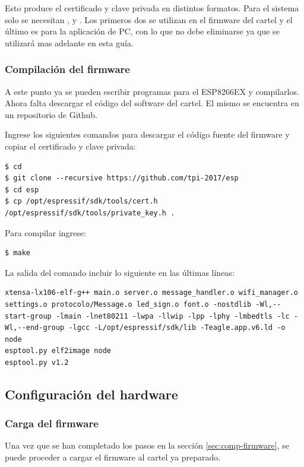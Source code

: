 Esto produce el certificado y clave privada en distintos formatos. Para el sistema solo se necesitan ,  y . Los primeros dos se utilizan en el firmware del cartel y el último es para la aplicación de PC, con lo que no debe eliminarse ya que se utilizará mas adelante en esta guía.

\subsubsection{Compilación del firmware}
A este punto ya se pueden escribir programas para el ESP8266EX y compilarlos. Ahora falta descargar el código del software del cartel. El mismo se encuentra en un repositorio de Github.


Ingrese los siguientes comandos para descargar el código fuente del firmware y copiar el certificado y clave privada:

\begin{lstlisting}
$ cd
$ git clone --recursive https://github.com/tpi-2017/esp
$ cd esp
$ cp /opt/espressif/sdk/tools/cert.h /opt/espressif/sdk/tools/private_key.h .
\end{lstlisting}

Para compilar ingrese:
\begin{lstlisting}
$ make
\end{lstlisting}

La salida del comando  incluir lo siguiente en las últimas líneas:
\begin{lstlisting}
xtensa-lx106-elf-g++ main.o server.o message_handler.o wifi_manager.o settings.o protocolo/Message.o led_sign.o font.o -nostdlib -Wl,--start-group -lmain -lnet80211 -lwpa -llwip -lpp -lphy -lmbedtls -lc -Wl,--end-group -lgcc -L/opt/espressif/sdk/lib -Teagle.app.v6.ld -o node
esptool.py elf2image node
esptool.py v1.2
\end{lstlisting}

\subsection{Configuración del hardware}
\subsubsection{Carga del firmware}
Una vez que se han completado los pasos en la sección \ref{sec:comp-firmware}, se puede proceder a cargar el firmware al cartel ya preparado.

